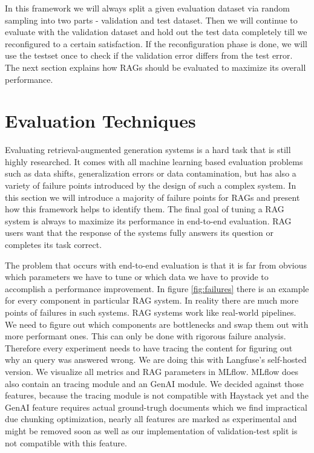 In this framework we will always split a given evaluation dataset via random sampling into two parts - validation and test dataset. Then we will continue to evaluate with the validation dataset and hold out the test data completely till we reconfigured to a certain satisfaction. If the reconfiguration phase is done, we will use the testset once to check if the validation error differs from the test error. The next section explains how RAGs should be evaluated to maximize its overall performance.

\section{Evaluation Techniques}

Evaluating retrieval-augmented generation systems is a hard task that is still highly researched. It comes with all machine learning based evaluation problems such as data shifts, generalization errors or data contamination, but has also a variety of failure points introduced by the design of such a complex system. In this section we will introduce a majority of failure points for RAGs and present how this framework helps to identify them. The final goal of tuning a RAG system is always to maximize its performance in end-to-end evaluation. RAG users want that the response of the systems fully answers its question or completes its task correct. 

The problem that occurs with end-to-end evaluation is that it is far from obvious which parameters we have to tune or which data we have to provide to accomplish a performance improvement. In figure \ref{fig:failures} there is an example for every component in particular RAG system. In reality there are much more points of failures in such systems. RAG systems work like real-world pipelines. We need to figure out which components are bottlenecks and swap them out with more performant ones. This can only be done with rigorous failure analysis. Therefore every experiment needs to have tracing the content for figuring out why an query was answered wrong. We are doing this with Langfuse's\cite{Langfuse} self-hosted version. We visualize all metrics and RAG parameters in MLflow\cite{MLflow}. MLflow does also contain an tracing module and an GenAI module. We decided against those features, because the tracing module is not compatible with Haystack yet and the GenAI feature requires actual ground-trugh documents which we find impractical due chunking optimization, nearly all features are marked as experimental and might be removed soon as well as our implementation of validation-test split is not compatible with this feature.

